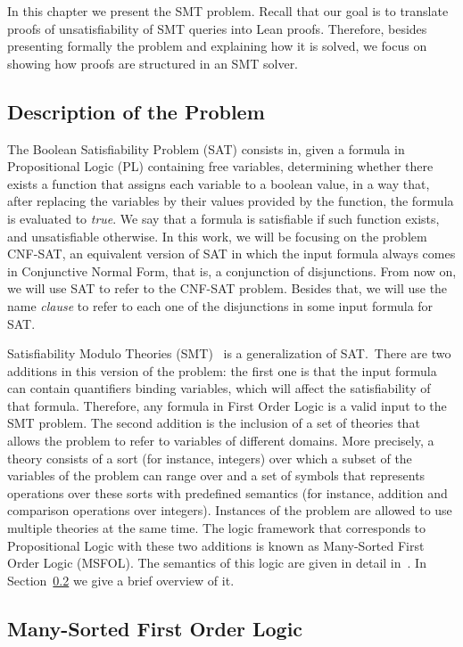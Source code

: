 
In this chapter we present the SMT problem. Recall that our goal is to translate proofs of unsatisfiability of SMT queries into Lean proofs. Therefore, besides presenting formally the problem and explaining how it is solved, we focus on showing how proofs are structured in an SMT solver.

\subsection{Description of the Problem}

The Boolean Satisfiability Problem (SAT) consists in, given a formula in Propositional Logic (PL) containing free variables, determining whether there exists a function that assigns each variable to a boolean value, in a way that, after replacing the variables by their values provided by the function, the formula is evaluated to \textit{true}. We say that a formula is satisfiable if such function exists, and unsatisfiable otherwise. In this work, we will be focusing on the problem CNF-SAT, an equivalent version of SAT in which the input formula always comes in Conjunctive Normal Form, that is, a conjunction of disjunctions. From now on, we will use SAT to refer to the CNF-SAT problem. Besides that, we will use the name \textit{clause} to refer to each one of the disjunctions in some input formula for SAT.

Satisfiability Modulo Theories (SMT)~\cite{smt} is a generalization of SAT.\ There are two additions in this version of the problem: the first one is that the input formula can contain quantifiers binding variables, which will affect the satisfiability of that formula. Therefore, any formula in First Order Logic is a valid input to the SMT problem. The second addition is the inclusion of a set of theories that allows the problem to refer to variables of different domains. More precisely, a theory consists of a sort (for instance, integers) over which a subset of the variables of the problem can range over and a set of symbols that represents operations over these sorts with predefined semantics (for instance, addition and comparison operations over integers). Instances of the problem are allowed to use multiple theories at the same time. The logic framework that corresponds to Propositional Logic with these two additions is known as Many-Sorted First Order Logic (MSFOL). The semantics of this logic are given in detail in~\cite{many_sorted}. In Section~\ref{sec:msfolHere} we give a brief overview of it.

\subsection{Many-Sorted First Order Logic}\label{sec:msfolHere}

